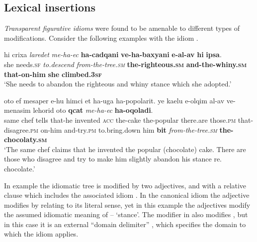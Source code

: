 \documentclass[output=paper]{langsci/langscibook}
\begin{document}
\subsection{Lexical insertions}
\label{she:sec:li}

\textit{Transparent figurative idioms} were found to be amenable to different types of modifications. Consider the following examples with the idiom .

    \ea\label{she:ec-rc-mod}
        \gll hi crixa \textit{laredet} \textit{me-ha-{\ayin}ec} \textbf{ha-cadqani} \textbf{ve-ha-baxyani} \textbf{{\shinB}e-{\ayinB}al-av} \textbf{hi} \textbf{{\tetB}ipsa}.\\
            she needs.\textsc{sf} \textit{to.descend} \textit{from-the-tree.\textsc{sm}} \textbf{the-righteous.\textsc{sm}} \textbf{and-the-whiny.\textsc{sm}} \textbf{that-on-him} \textbf{she} \textbf{climbed.\textsc{3sf}}\\
        \glt `She needs to abandon the righteous and whiny stance which she adopted.'
    \z

    \ea\label{she:ec-ins-int-ext-mod}
        \gll {\alef}oto {\shin}ef mesaper {\shin}e-hu himci {\alef}et ha-{\ayin}uga ha-popolarit. ye{\shin} ka{\alef}elu {\shin}e-{\het}olqim {\ayin}al-av ve-menasim lehorid {\alef}oto \textbf{qcat} \textit{me-ha-{\ayin}ec} \textbf{ha-{\shinB}oqoladi}.\\
            same chef tells that-he invented \textsc{acc} the-cake the-popular there.are those.\textsc{pm} that-disagree.\textsc{pm} on-him and-try.\textsc{pm} to.bring.down him \textbf{bit} \textit{from-the-tree.\textsc{sm}} \textbf{the-chocolaty.\textsc{sm}}\\
        \glt `The same chef claims that he invented the popular (chocolate) cake. There are those who disagree and try to make him slightly abandon his stance re. chocolate.'
    \z

In example  the idiomatic tree is modified by two adjectives, and with a relative clause which includes the associated idiom . In the canonical idiom the adjective  modifies  by relating to its literal sense, yet in this example the adjectives modify the assumed idiomatic meaning of  -- `stance'. The modifier  in  also modifies , but in this case it is an external ``domain delimiter'' \citep{ernst81}, which specifies the domain to which the idiom applies.
\end{document}
